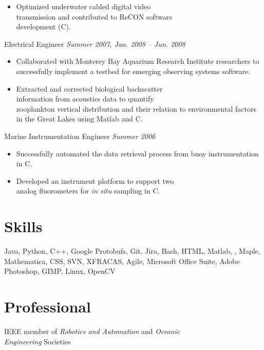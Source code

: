 \documentclass{article}
\begin{document}
{\begin{multicols}{2}
\begin{itemize}[noitemsep,nolistsep]
	\item Optimized underwater cabled digital video \\transmission and contributed to ReCON software \\development (C).
    \end{itemize}
    \vspace{5px}
    Electrical Engineer  \hfill \textsl{Summer 2007, Jan. 2008 -- Jun. 2008}  \\
    \vspace{ -10px}	
    \begin{itemize}[noitemsep,nolistsep]
	\item Collaborated with Monterey Bay Aquarium Research Institute researchers to successfully implement a testbed for emerging observing systems software.
	\item Extracted and corrected biological backscatter \\information from acoustics data to quantify \\zooplankton vertical distribution and their relation to environmental factors in the Great Lakes using Matlab and C.
    \end{itemize}
    \vspace{5px}
    Marine Instrumentation Engineer \hfill \textsl{Summer 2006} \\
    \vspace{ -10px}	
    \begin{itemize}[noitemsep,nolistsep]
	\item Successfully automated the data retrieval process from buoy instrumentation in C. 
	\item Developed an instrument platform to support two \\analog fluorometers for \textit{in situ} sampling in C. 
    \end{itemize}
    \vspace{5px}
    \section*{Skills} 
    \noindent
    Java, Python, C++, Google Protobufs, Git, Jira, Bash, HTML, Matlab, \LaTeXe, Maple, Mathematica, CSS, SVN, XFRACAS, Agile, Microsoft Office Suite, Adobe Photoshop, GIMP, Linux, OpenCV
    \section*{Professional} 
    \noindent
    IEEE member of \textsl{Robotics and Automation} and \textsl{Oceanic \\Engineering} Societies  
\end{multicols}
}
\end{document}
